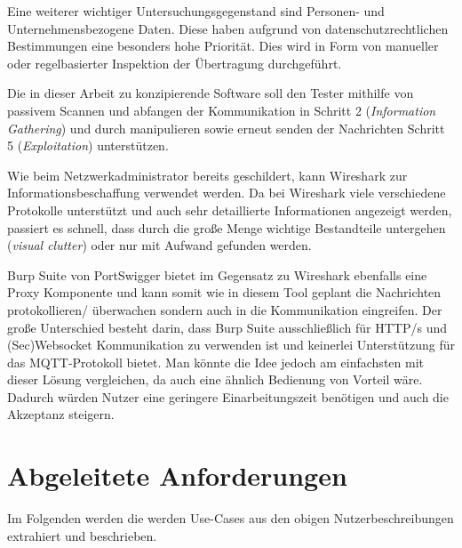     Eine weiterer wichtiger Untersuchungsgegenstand sind Personen- und Unternehmensbezogene Daten. Diese haben aufgrund von datenschutzrechtlichen Bestimmungen eine besonders hohe Priorität. Dies wird in Form von manueller oder regelbasierter Inspektion der Übertragung durchgeführt.
    
    
    Die in dieser Arbeit zu konzipierende Software soll den Tester mithilfe von passivem Scannen und abfangen der Kommunikation in Schritt 2 (\emph{Information Gathering}) und durch manipulieren sowie erneut senden der Nachrichten Schritt 5 (\emph{Exploitation}) unterstützen.
    
    Wie beim Netzwerkadministrator bereits geschildert, kann Wireshark zur Informationsbeschaffung verwendet werden.
    Da bei Wireshark viele verschiedene Protokolle unterstützt und auch sehr detaillierte Informationen angezeigt werden, passiert es schnell, dass durch die große Menge wichtige Bestandteile untergehen (\emph{visual clutter}) oder nur mit Aufwand gefunden werden.
    
    Burp Suite von PortSwigger bietet im Gegensatz zu Wireshark ebenfalls eine Proxy Komponente und kann somit wie in diesem Tool geplant die Nachrichten protokollieren/ überwachen sondern auch in die Kommunikation eingreifen. Der große Unterschied besteht darin, dass Burp Suite ausschließlich für HTTP/s und (Sec)Websocket Kommunikation zu verwenden ist und keinerlei Unterstützung für das \ac{MQTT}-Protokoll bietet. Man könnte die Idee jedoch am einfachsten mit dieser Lösung vergleichen, da auch eine ähnlich Bedienung von Vorteil wäre. Dadurch würden Nutzer eine geringere Einarbeitungszeit benötigen und auch die Akzeptanz steigern.

\section{Abgeleitete Anforderungen}
    Im Folgenden werden die werden Use-Cases aus den obigen Nutzerbeschreibungen extrahiert und beschrieben.

